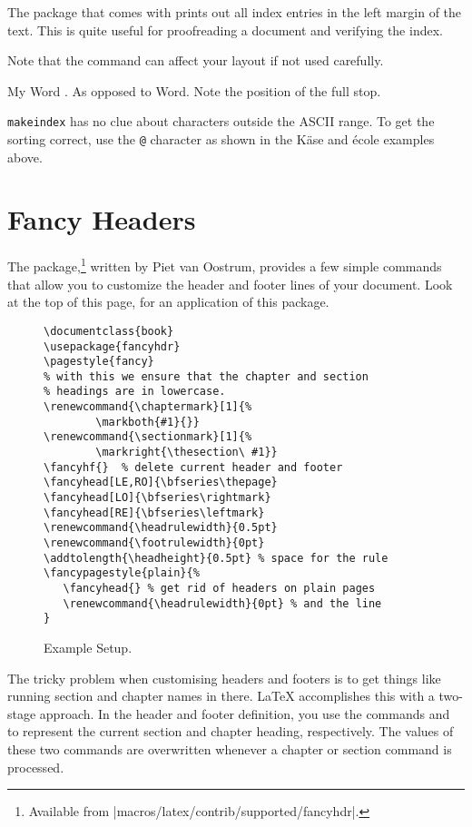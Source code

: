 The  package that comes with \LaTeXe{} prints out all
index entries in the left margin of the text. This is quite useful for
proofreading a document and verifying the index.

Note that the  command can affect your layout if not used carefully.

\begin{example}
My Word . As opposed
to Word. Note the
position of the full stop.
\end{example}

\texttt{makeindex} has no clue about characters outside the ASCII range. To
get the sorting correct, use the \verb|@| character as shown in the K\"ase
and \'ecole examples above.

\section{Fancy Headers}
\label{sec:fancy}

The  package,\footnote{Available from
  \CTAN|macros/latex/contrib/supported/fancyhdr|.} written by
Piet van Oostrum, provides a few simple commands that allow you to
customize the header and footer lines of your document.  Look
at the top of this page, for an application of this
package.

\begin{figure}[!htbp]
\begin{lined}{\textwidth}
\begin{verbatim}
\documentclass{book}
\usepackage{fancyhdr}
\pagestyle{fancy}
% with this we ensure that the chapter and section
% headings are in lowercase.
\renewcommand{\chaptermark}[1]{%
        \markboth{#1}{}}
\renewcommand{\sectionmark}[1]{%
        \markright{\thesection\ #1}}
\fancyhf{}  % delete current header and footer
\fancyhead[LE,RO]{\bfseries\thepage}
\fancyhead[LO]{\bfseries\rightmark}
\fancyhead[RE]{\bfseries\leftmark}
\renewcommand{\headrulewidth}{0.5pt}
\renewcommand{\footrulewidth}{0pt}
\addtolength{\headheight}{0.5pt} % space for the rule
\fancypagestyle{plain}{%
   \fancyhead{} % get rid of headers on plain pages
   \renewcommand{\headrulewidth}{0pt} % and the line
}
\end{verbatim}
\end{lined}
\caption{Example  Setup.} \label{fancyhdr}
\end{figure}

The tricky problem when customising headers and footers is to get
things like running section and chapter names in there. \LaTeX{}
accomplishes this with a two-stage approach. In the header and footer
definition, you use the commands  and  to
represent the current section and chapter heading, respectively.
The values of these two commands are overwritten whenever a chapter or
section command is processed.


